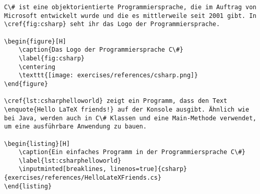 \begin{verbatim}
C\# ist eine objektorientierte Programmiersprache, die im Auftrag von Microsoft entwickelt wurde und die es mittlerweile seit 2001 gibt. In \cref{fig:csharp} seht ihr das Logo der Programmiersprache. 
	
\begin{figure}[H]
	\caption{Das Logo der Programmiersprache C\#}
	\label{fig:csharp}
	\centering
	\texttt{[image: exercises/references/csharp.png]}
\end{figure}

\cref{lst:csharphelloworld} zeigt ein Programm, dass den Text \enquote{Hello LaTeX friends!} auf der Konsole ausgibt. Ähnlich wie bei Java, werden auch in C\# Klassen und eine Main-Methode verwendet, um eine ausführbare Anwendung zu bauen. 
	
\begin{listing}[H]
	\caption{Ein einfaches Programm in der Programmiersprache C\#}
	\label{lst:csharphelloworld}
	\inputminted[breaklines, linenos=true]{csharp}{exercises/references/HelloLateXFriends.cs}
\end{listing}
\end{verbatim}



	


